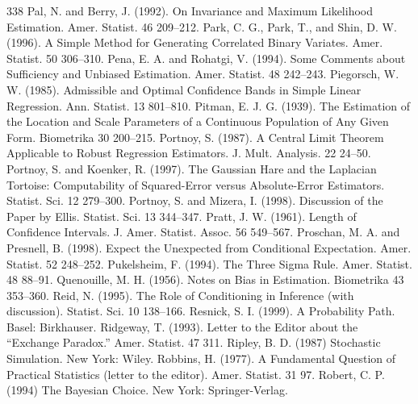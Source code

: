 \begin{thebibliography}{338}
\label{bib:source238} Pal, N. and Berry, J. (1992). On Invariance and Maximum Likelihood Estimation. Amer. Statist. 46 209–212.
\label{bib:source239} Park, C. G., Park, T., and Shin, D. W. (1996). A Simple Method for Generating Correlated Binary Variates. Amer. Statist. 50 306–310.
\label{bib:source240} Pena, E. A. and Rohatgi, V. (1994). Some Comments about Sufficiency and Unbiased Estimation. Amer. Statist. 48 242–243.
\label{bib:source241} Piegorsch, W. W. (1985). Admissible and Optimal Confidence Bands in Simple Linear Regression. Ann. Statist. 13 801–810.
\label{bib:source242} Pitman, E. J. G. (1939). The Estimation of the Location and Scale Parameters of a Continuous Population of Any Given Form. Biometrika 30 200–215.
\label{bib:source243} Portnoy, S. (1987). A Central Limit Theorem Applicable to Robust Regression Estimators. J. Mult. Analysis. 22 24–50.
\label{bib:source244} Portnoy, S. and Koenker, R. (1997). The Gaussian Hare and the Laplacian Tortoise: Computability of Squared-Error versus Absolute-Error Estimators. Statist. Sci. 12 279–300.
\label{bib:source245} Portnoy, S. and Mizera, I. (1998). Discussion of the Paper by Ellis. Statist. Sci. 13 344–347.
\label{bib:source246} Pratt, J. W. (1961). Length of Confidence Intervals. J. Amer. Statist. Assoc. 56 549–567.
\label{bib:source247} Proschan, M. A. and Presnell, B. (1998). Expect the Unexpected from Conditional Expectation. Amer. Statist. 52 248–252.
\label{bib:source248} Pukelsheim, F. (1994). The Three Sigma Rule. Amer. Statist. 48 88–91.
\label{bib:source249} Quenouille, M. H. (1956). Notes on Bias in Estimation. Biometrika 43 353–360.
\label{bib:source250} Reid, N. (1995). The Role of Conditioning in Inference (with discussion). Statist. Sci. 10 138–166.
\label{bib:source251} Resnick, S. I. (1999). A Probability Path. Basel: Birkhauser.
\label{bib:source252} Ridgeway, T. (1993). Letter to the Editor about the “Exchange Paradox.” Amer. Statist. 47 311.
\label{bib:source253} Ripley, B. D. (1987) Stochastic Simulation. New York: Wiley.
\label{bib:source254} Robbins, H. (1977). A Fundamental Question of Practical Statistics (letter to the editor). Amer. Statist. 31 97.
\label{bib:source255} Robert, C. P. (1994) The Bayesian Choice. New York: Springer-Verlag.

\end{thebibliography}
